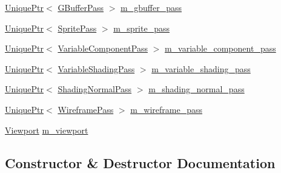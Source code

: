 \begin{DoxyCompactItemize}
\item 
\hyperlink{namespacemage_a3316d7143a973e37adf1110f2e80ca31}{Unique\+Ptr}$<$ \hyperlink{classmage_1_1_g_buffer_pass}{G\+Buffer\+Pass} $>$ \hyperlink{classmage_1_1_scene_renderer_a7892cf0b6e53a8d1a5cef1b81353d77a}{m\+\_\+gbuffer\+\_\+pass}
\item 
\hyperlink{namespacemage_a3316d7143a973e37adf1110f2e80ca31}{Unique\+Ptr}$<$ \hyperlink{classmage_1_1_sprite_pass}{Sprite\+Pass} $>$ \hyperlink{classmage_1_1_scene_renderer_a39d0db7aa9275362cd460339143a089b}{m\+\_\+sprite\+\_\+pass}
\item 
\hyperlink{namespacemage_a3316d7143a973e37adf1110f2e80ca31}{Unique\+Ptr}$<$ \hyperlink{classmage_1_1_variable_component_pass}{Variable\+Component\+Pass} $>$ \hyperlink{classmage_1_1_scene_renderer_af3544515e1792eb3b1c1e511b1bccf46}{m\+\_\+variable\+\_\+component\+\_\+pass}
\item 
\hyperlink{namespacemage_a3316d7143a973e37adf1110f2e80ca31}{Unique\+Ptr}$<$ \hyperlink{classmage_1_1_variable_shading_pass}{Variable\+Shading\+Pass} $>$ \hyperlink{classmage_1_1_scene_renderer_a9ee6d267f8cfb7826c16acd4fe0b7852}{m\+\_\+variable\+\_\+shading\+\_\+pass}
\item 
\hyperlink{namespacemage_a3316d7143a973e37adf1110f2e80ca31}{Unique\+Ptr}$<$ \hyperlink{classmage_1_1_shading_normal_pass}{Shading\+Normal\+Pass} $>$ \hyperlink{classmage_1_1_scene_renderer_a183c95ded274991bc80dccd8a373cce5}{m\+\_\+shading\+\_\+normal\+\_\+pass}
\item 
\hyperlink{namespacemage_a3316d7143a973e37adf1110f2e80ca31}{Unique\+Ptr}$<$ \hyperlink{classmage_1_1_wireframe_pass}{Wireframe\+Pass} $>$ \hyperlink{classmage_1_1_scene_renderer_a3f84786f9ed001345c746292cb08ad2f}{m\+\_\+wireframe\+\_\+pass}
\item 
\hyperlink{structmage_1_1_viewport}{Viewport} \hyperlink{classmage_1_1_scene_renderer_a10ea57172c4a79a3b4d4a8161e705437}{m\+\_\+viewport}
\end{DoxyCompactItemize}


\subsection{Constructor \& Destructor Documentation}
\hypertarget{classmage_1_1_scene_renderer_a5d91f3c9b4e6e7c16d77a6791fadbd64}{}\label{classmage_1_1_scene_renderer_a5d91f3c9b4e6e7c16d77a6791fadbd64} 

